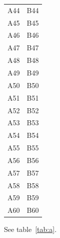 \documentclass{article}
\begin{document}
\begin{longtable}{ll}
  A44 & B44 \\ A45 & B45 \\ A46 & B46 \\ A47 & B47 \\ A48 & B48 \\ A49 & B49 \\
  A50 & B50 \\ A51 & B51 \\ A52 & B52 \\ A53 & B53 \\ A54 & B54 \\ A55 & B55 \\
  A56 & B56 \\ A57 & B57 \\ A58 & B58 \\ A59 & B59 \\ A60 & B60 \\
\end{longtable}

See table~\ref{tab:a}.
\end{document}
